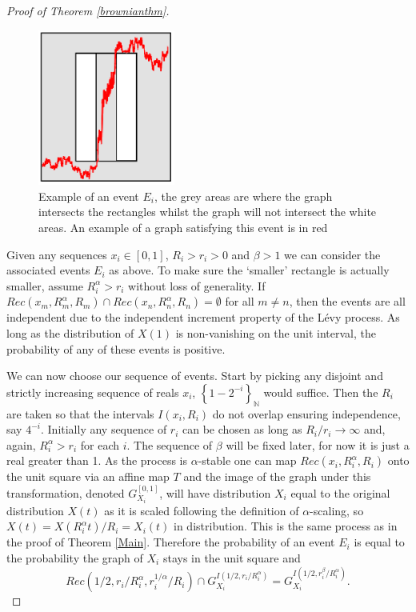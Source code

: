 \begin{proof}[Proof of Theorem \ref{brownianthm}]
\begin{figure}[htbp]
	\centering
	\includegraphics[width=0.4\textwidth]{pics/ch-brownian/new_rectangles.png}
	\caption{Example of an event $E_i$, the grey areas are where the graph intersects the rectangles whilst the graph will not intersect the white areas. An example of a graph satisfying this event is in red}
	\label{brownian_event}
\end{figure}

Given any sequences $x_i \in [0,1]$, $R_i > r_i > 0$ and $\beta > 1$ we can consider the associated events $E_i$ as above. To make sure the `smaller' rectangle is actually smaller, assume $R_i^{\alpha} > r_i$ without loss of generality. If $Rec(x_m,R_m^{\alpha}, R_m) \cap Rec(x_n,R_n^{\alpha},R_n) = \emptyset$ for all $m\neq n$, then the events are all independent due to the independent increment property of the L\'evy process. As long as the distribution of $X(1)$ is non-vanishing on the unit interval, the probability of any of these events is positive.

We can now choose our sequence of events. Start by picking any disjoint and strictly increasing sequence of reals  $x_i$, $\left\{1-2^{-i} \right\}_{\mathbb{N}}$ would suffice. Then the $R_i$ are taken so that the intervals $I(x_i, R_i)$ do not overlap ensuring independence, say $4^{-i}$. Initially any sequence of $r_i$ can be chosen as long as $R_i/r_i \rightarrow \infty$ and, again, $R_i^{\alpha} > r_i$ for each $i$. The sequence of $\beta$ will be fixed later, for now it is just a real greater than 1. As the process is $\alpha$-stable one can map $Rec(x_i,R_i^{\alpha},R_i)$ onto the unit square via an affine map $T$ and the image of the graph under this transformation, denoted $G_{X_i}^{[0,1]}$, will have distribution $X_i$ equal to the original distribution $X(t)$ as it is scaled following the definition of $\alpha$-scaling, so $X(t) = X(R_i^\alpha t)/R_i = X_i(t)$ in distribution. This is the same process as in the proof of Theorem \ref{Main}. Therefore the probability of an event $E_i$ is equal to the probability the graph of $X_i$ stays in the unit square and 
$$Rec(1/2,r_i/R_i^{\alpha} ,r_i^{1/\alpha}/R_i ) \cap G_{X_i}^{I(1/2, r_i/R_i^{\alpha})} = G_{X_i}^{I(1/2, r_i^{\beta}/R_i^{\alpha})}.$$


\end{proof}

